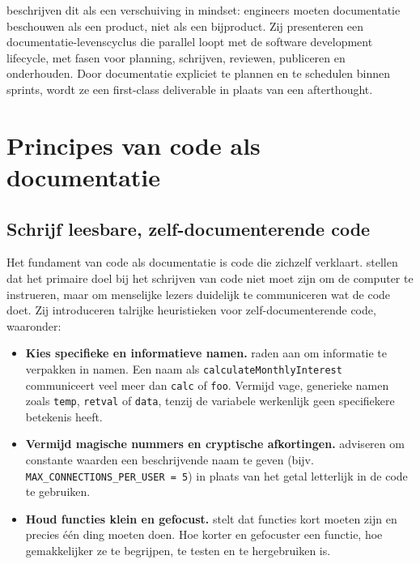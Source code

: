 \textcite{bhatti2021docsdevelopers} beschrijven dit als een verschuiving in mindset: engineers moeten documentatie beschouwen als een product, niet als een bijproduct.
Zij presenteren een documentatie-levenscyclus die parallel loopt met de software development lifecycle, met fasen voor planning, schrijven, reviewen, publiceren en onderhouden.
Door documentatie expliciet te plannen en te schedulen binnen sprints, wordt ze een first-class deliverable in plaats van een afterthought.

\section{Principes van code als documentatie}
\label{sec:cad-principes}

\subsection{Schrijf leesbare, zelf-documenterende code}
Het fundament van code als documentatie is code die zichzelf verklaart.
\textcite{boswell2011readablecode} stellen dat het primaire doel bij het schrijven van code niet moet zijn om de computer te instrueren, maar om menselijke lezers duidelijk te communiceren wat de code doet.
Zij introduceren talrijke heuristieken voor zelf-documenterende code, waaronder:

\begin{itemize}
\item \textbf{Kies specifieke en informatieve namen.} \textcite{boswell2011readablecode} raden aan om informatie te verpakken in namen. Een naam als \texttt{calculateMonthlyInterest} communiceert veel meer dan \texttt{calc} of \texttt{foo}. Vermijd vage, generieke namen zoals \texttt{temp}, \texttt{retval} of \texttt{data}, tenzij de variabele werkenlijk geen specifiekere betekenis heeft.
\item \textbf{Vermijd magische nummers en cryptische afkortingen.} \textcite{boswell2011readablecode} adviseren om constante waarden een beschrijvende naam te geven (bijv. \texttt{MAX\_CONNECTIONS\_PER\_USER = 5}) in plaats van het getal letterlijk in de code te gebruiken.
\item \textbf{Houd functies klein en gefocust.} \textcite{martin2008clean} stelt dat functies kort moeten zijn en precies \'e\'en ding moeten doen. Hoe korter en gefocuster een functie, hoe gemakkelijker ze te begrijpen, te testen en te hergebruiken is.
\end{itemize}

